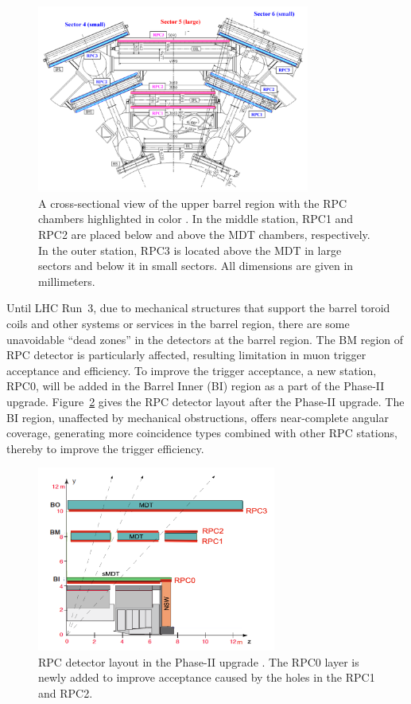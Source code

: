 \begin{figure}[htbp]
  \centering
  \includegraphics[width=0.8\textwidth]{figs/chapter2/RPC_layout.png}
  \caption{A cross-sectional view of the upper barrel region with the RPC chambers highlighted in color \cite{ATLASDetector2008}. In the middle station, RPC1 and RPC2 are placed below and above the MDT chambers, respectively. In the outer station, RPC3 is located above the MDT in large sectors and below it in small sectors. All dimensions are given in millimeters.}
  \label{fig:RPC_layout}
\end{figure}

Until LHC Run~3, due to mechanical structures that support the barrel toroid coils and other systems or services in the barrel region, there are some unavoidable ``dead zones'' in the detectors at the barrel region. The BM region of RPC detector is particularly affected, resulting limitation in muon trigger acceptance and efficiency. To improve the trigger acceptance, a new station, RPC0, will be added in the Barrel Inner (BI) region as a part of the Phase-II upgrade. Figure~\ref{fig:RPC_structure_upgrade} gives the RPC detector layout after the Phase-II upgrade. The BI region, unaffected by mechanical obstructions, offers near-complete angular coverage, generating more coincidence types combined with other RPC stations, thereby to improve the trigger efficiency.

\begin{figure}[htbp]
  \centering
  \includegraphics[width=0.7\textwidth]{figs/chapter2/RPC_detector_structure.png}
  \caption{RPC detector layout in the Phase-II upgrade \cite{TDAQ_TDR}. The RPC0 layer is newly added to improve acceptance caused by the holes in the RPC1 and RPC2.}
  \label{fig:RPC_structure_upgrade}
\end{figure}

